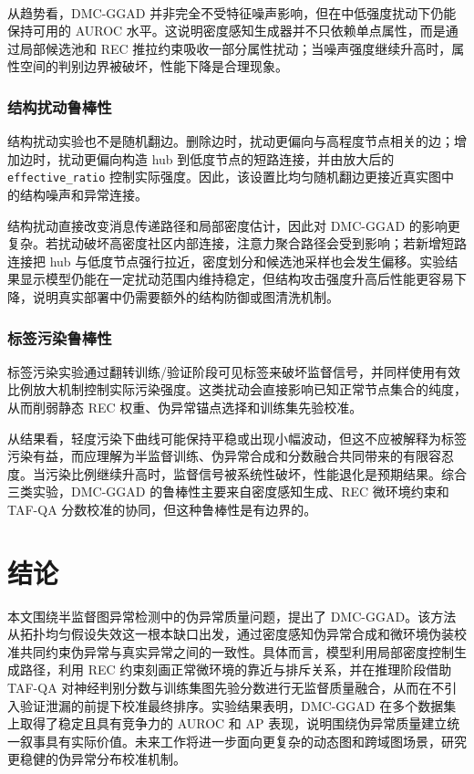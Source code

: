 ﻿﻿﻿﻿    \documentclass[conference, onecolumn]{IEEEtran}
\begin{document}
    从趋势看，DMC-GGAD 并非完全不受特征噪声影响，但在中低强度扰动下仍能保持可用的 AUROC 水平。这说明密度感知生成器并不只依赖单点属性，而是通过局部候选池和 REC 推拉约束吸收一部分属性扰动；当噪声强度继续升高时，属性空间的判别边界被破坏，性能下降是合理现象。

    \subsubsection{结构扰动鲁棒性}
    结构扰动实验也不是随机翻边。删除边时，扰动更偏向与高程度节点相关的边；增加边时，扰动更偏向构造 hub 到低度节点的短路连接，并由放大后的 \texttt{effective\_ratio} 控制实际强度。因此，该设置比均匀随机翻边更接近真实图中的结构噪声和异常连接。

    结构扰动直接改变消息传递路径和局部密度估计，因此对 DMC-GGAD 的影响更复杂。若扰动破坏高密度社区内部连接，注意力聚合路径会受到影响；若新增短路连接把 hub 与低度节点强行拉近，密度划分和候选池采样也会发生偏移。实验结果显示模型仍能在一定扰动范围内维持稳定，但结构攻击强度升高后性能更容易下降，说明真实部署中仍需要额外的结构防御或图清洗机制。

    \subsubsection{标签污染鲁棒性}
    标签污染实验通过翻转训练/验证阶段可见标签来破坏监督信号，并同样使用有效比例放大机制控制实际污染强度。这类扰动会直接影响已知正常节点集合的纯度，从而削弱静态 REC 权重、伪异常锚点选择和训练集先验校准。

    从结果看，轻度污染下曲线可能保持平稳或出现小幅波动，但这不应被解释为标签污染有益，而应理解为半监督训练、伪异常合成和分数融合共同带来的有限容忍度。当污染比例继续升高时，监督信号被系统性破坏，性能退化是预期结果。综合三类实验，DMC-GGAD 的鲁棒性主要来自密度感知生成、REC 微环境约束和 TAF-QA 分数校准的协同，但这种鲁棒性是有边界的。

    \section{结论}
    本文围绕半监督图异常检测中的伪异常质量问题，提出了 DMC-GGAD。该方法从拓扑均匀假设失效这一根本缺口出发，通过密度感知伪异常合成和微环境伪装校准共同约束伪异常与真实异常之间的一致性。具体而言，模型利用局部密度控制生成路径，利用 REC 约束刻画正常微环境的靠近与排斥关系，并在推理阶段借助 TAF-QA 对神经判别分数与训练集图先验分数进行无监督质量融合，从而在不引入验证泄漏的前提下校准最终排序。实验结果表明，DMC-GGAD 在多个数据集上取得了稳定且具有竞争力的 AUROC 和 AP 表现，说明围绕伪异常质量建立统一叙事具有实际价值。未来工作将进一步面向更复杂的动态图和跨域图场景，研究更稳健的伪异常分布校准机制。
\end{document}
